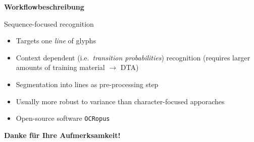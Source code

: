 \documentclass{bbawslides}
\begin{document}
\begin{bbawpart}{\Large\bf Workflowbeschreibung}
\end{bbawpart}

\begin{bbawslide}{Sequence-focused recognition}
    \vspace*{1.5em}%
    \hspace*{-2em}%
        \begin{minipage}{1.05\textwidth}
            \begin{itemize}
                \item Targets one \emph{line} of glyphs
            \end{itemize}
        \end{minipage}
    \begin{center}
    \end{center}
        \begin{minipage}{1.05\textwidth}
            \begin{itemize}
                \item Context dependent (i.e.~\emph{transition probabilities}) recognition (requires larger amounts of training material $\rightarrow$ DTA)
                \item Segmentation into lines as pre-processing step
                \item Usually more robust to variance than character-focused apporaches
                \item Open-source software \texttt{OCRopus}
            \end{itemize}
        \end{minipage}
\end{bbawslide}
\begin{bbawpart}{\Large\bf Danke für Ihre Aufmerksamkeit!\\}
\end{bbawpart}
\end{document}
